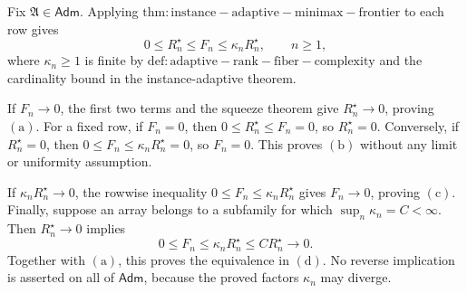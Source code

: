 Fix \(\mathfrak A\in\mathsf{Adm}\). Applying \(\mathrm{thm:instance-adaptive-minimax-frontier}\) to each row gives
\[
 0\le R_n^{\star}\le F_n\le\kappa_nR_n^{\star},
 \qquad n\ge1,
\]
where \(\kappa_n\ge1\) is finite by \(\mathrm{def:adaptive-rank-fiber-complexity}\) and the cardinality bound in the instance-adaptive theorem.

If \(F_n\to0\), the first two terms and the squeeze theorem give \(R_n^{\star}\to0\), proving \(\mathrm{(a)}\). For a fixed row, if \(F_n=0\), then \(0\le R_n^{\star}\le F_n=0\), so \(R_n^{\star}=0\). Conversely, if \(R_n^{\star}=0\), then \(0\le F_n\le\kappa_nR_n^{\star}=0\), so \(F_n=0\). This proves \(\mathrm{(b)}\) without any limit or uniformity assumption.

If \(\kappa_nR_n^{\star}\to0\), the rowwise inequality \(0\le F_n\le\kappa_nR_n^{\star}\) gives \(F_n\to0\), proving \(\mathrm{(c)}\). Finally, suppose an array belongs to a subfamily for which \(\sup_n\kappa_n=C<\infty\). Then \(R_n^{\star}\to0\) implies
\[
 0\le F_n\le\kappa_nR_n^{\star}\le C R_n^{\star}\longrightarrow0.
\]
Together with \(\mathrm{(a)}\), this proves the equivalence in \(\mathrm{(d)}\). No reverse implication is asserted on all of \(\mathsf{Adm}\), because the proved factors \(\kappa_n\) may diverge.